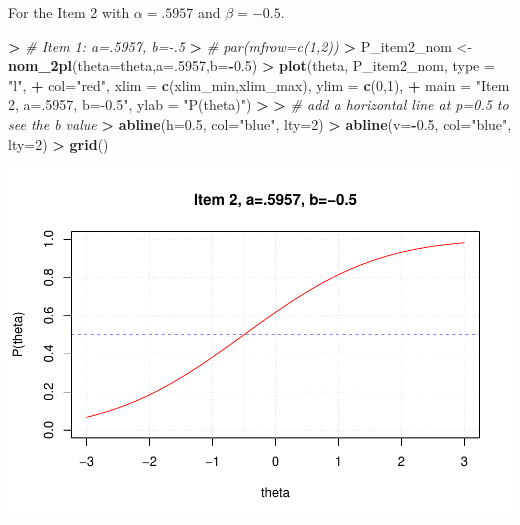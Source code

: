 \documentclass[
]{article}
\newenvironment{Shaded}{\begin{snugshade}}{\end{snugshade}}
\newcommand{\AttributeTok}[1]{\textcolor[rgb]{0.13,0.29,0.53}{#1}}
\newcommand{\CommentTok}[1]{\textcolor[rgb]{0.56,0.35,0.01}{\textit{#1}}}
\newcommand{\DecValTok}[1]{\textcolor[rgb]{0.00,0.00,0.81}{#1}}
\newcommand{\ErrorTok}[1]{\textcolor[rgb]{0.64,0.00,0.00}{\textbf{#1}}}
\newcommand{\FloatTok}[1]{\textcolor[rgb]{0.00,0.00,0.81}{#1}}
\newcommand{\FunctionTok}[1]{\textcolor[rgb]{0.13,0.29,0.53}{\textbf{#1}}}
\newcommand{\NormalTok}[1]{#1}
\newcommand{\OtherTok}[1]{\textcolor[rgb]{0.56,0.35,0.01}{#1}}
\newcommand{\SpecialCharTok}[1]{\textcolor[rgb]{0.81,0.36,0.00}{\textbf{#1}}}
\newcommand{\StringTok}[1]{\textcolor[rgb]{0.31,0.60,0.02}{#1}}
\begin{document}
For the Item 2 with \(\alpha=.5957\) and \(\beta=-0.5\).

\begin{Shaded}
\begin{Highlighting}[]
\SpecialCharTok{\textgreater{}} \CommentTok{\# Item 1: a=.5957, b={-}.5}
\ErrorTok{\textgreater{}} \CommentTok{\# par(mfrow=c(1,2))}
\ErrorTok{\textgreater{}}\NormalTok{ P\_item2\_nom }\OtherTok{\textless{}{-}} \FunctionTok{nom\_2pl}\NormalTok{(}\AttributeTok{theta=}\NormalTok{theta,}\AttributeTok{a=}\NormalTok{.}\DecValTok{5957}\NormalTok{,}\AttributeTok{b=}\SpecialCharTok{{-}}\FloatTok{0.5}\NormalTok{)}
\SpecialCharTok{\textgreater{}} \FunctionTok{plot}\NormalTok{(theta, P\_item2\_nom, }\AttributeTok{type =} \StringTok{"l"}\NormalTok{, }
\SpecialCharTok{+}      \AttributeTok{col=}\StringTok{"red"}\NormalTok{, }\AttributeTok{xlim =} \FunctionTok{c}\NormalTok{(xlim\_min,xlim\_max), }\AttributeTok{ylim =} \FunctionTok{c}\NormalTok{(}\DecValTok{0}\NormalTok{,}\DecValTok{1}\NormalTok{),}
\SpecialCharTok{+}      \AttributeTok{main =} \StringTok{"Item 2, a=.5957, b={-}0.5"}\NormalTok{, }\AttributeTok{ylab =} \StringTok{"P(theta)"}\NormalTok{)}
\SpecialCharTok{\textgreater{}} 
\ErrorTok{\textgreater{}} \CommentTok{\# add a horizontal line at p=0.5 to see the b value}
\ErrorTok{\textgreater{}} \FunctionTok{abline}\NormalTok{(}\AttributeTok{h=}\FloatTok{0.5}\NormalTok{, }\AttributeTok{col=}\StringTok{"blue"}\NormalTok{, }\AttributeTok{lty=}\DecValTok{2}\NormalTok{)}
\SpecialCharTok{\textgreater{}} \FunctionTok{abline}\NormalTok{(}\AttributeTok{v=}\SpecialCharTok{{-}}\FloatTok{0.5}\NormalTok{, }\AttributeTok{col=}\StringTok{"blue"}\NormalTok{, }\AttributeTok{lty=}\DecValTok{2}\NormalTok{)}
\SpecialCharTok{\textgreater{}} \FunctionTok{grid}\NormalTok{()}
\end{Highlighting}
\end{Shaded}

\includegraphics{Assignment_1_files/figure-latex/unnamed-chunk-3-1.pdf}
\end{document}
